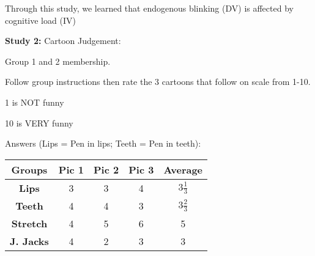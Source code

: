 \begin{enumerate}
\begin{coloredlist}
\begin{coloredlist}
\begin{coloredlist}
            \end{coloredlist}
        \end{coloredlist} 
        \item Through this study, we learned that endogenous blinking (DV) is affected by cognitive load (IV)
    \end{coloredlist}
    \item \textbf{Study 2:} Cartoon Judgement:
    \begin{coloredlist}
        \item Group 1 and 2 membership.
        \item Follow group instructions then rate the 3 cartoons that follow on scale from 1-10.
        \begin{coloredlist}
            \item 1 is NOT funny
            \item 10 is VERY funny
            \item Answers (Lips = Pen in lips; Teeth = Pen in teeth):

            \begin{tabular}[htbp]{ccccc}
                \toprule
                \textbf{Groups} & \textbf{Pic 1} & \textbf{Pic 2} & \textbf{Pic 3} & \textbf{Average} \\ \midrule
                \textbf{Lips} & 3 & 3 & 4 & \(3\frac{1}{3}\) \\ \midrule
                \textbf{Teeth} & 4 & 4 & 3 & \(3\frac{2}{3}\) \\ \midrule
                \textbf{Stretch} & 4 & 5 & 6 & 5 \\ \midrule
                \textbf{J. Jacks} & 4 & 2 & 3 & 3 \\ \bottomrule
            \end{tabular}


\end{coloredlist}
\end{coloredlist}
\end{enumerate}
